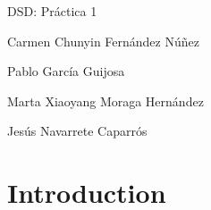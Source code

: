 \documentclass[a4paper]{book}
\begin{document}
\frontmatter

\begin{titlepage}
\centering


\Large DSD: Práctica 1


\normalsize Carmen Chunyin Fernández Núñez

\normalsize Pablo García Guijosa

\normalsize Marta Xiaoyang Moraga Hernández

\normalsize Jesús Navarrete Caparrós


\end{titlepage}

\restoregeometry

\tableofcontents

\mainmatter

\chapter{Introduction}
\end{document}
